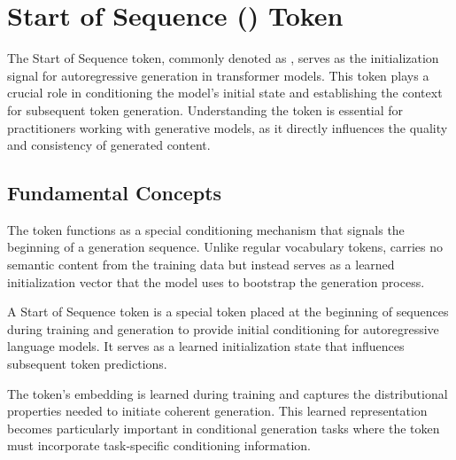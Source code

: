 
\section{Start of Sequence (\sos{}) Token}

The Start of Sequence token, commonly denoted as \sos{}, serves as the initialization signal for autoregressive generation in transformer models. This token plays a crucial role in conditioning the model's initial state and establishing the context for subsequent token generation. Understanding the \sos{} token is essential for practitioners working with generative models, as it directly influences the quality and consistency of generated content.

\subsection{Fundamental Concepts}

The \sos{} token functions as a special conditioning mechanism that signals the beginning of a generation sequence. Unlike regular vocabulary tokens, \sos{} carries no semantic content from the training data but instead serves as a learned initialization vector that the model uses to bootstrap the generation process.

\begin{definition}
A Start of Sequence token \sos{} is a special token placed at the beginning of sequences during training and generation to provide initial conditioning for autoregressive language models. It serves as a learned initialization state that influences subsequent token predictions.
\end{definition}

The \sos{} token's embedding is learned during training and captures the distributional properties needed to initiate coherent generation. This learned representation becomes particularly important in conditional generation tasks where the \sos{} token must incorporate task-specific conditioning information.

